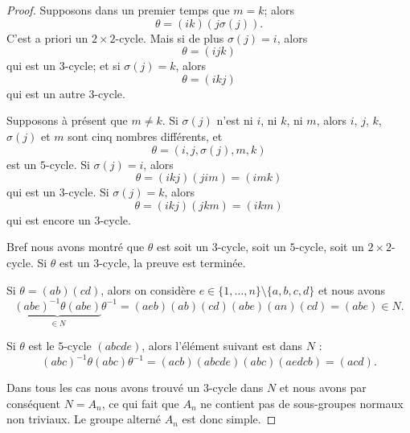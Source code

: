 \begin{proof}
    Supposons dans un premier temps que \( m=k\); alors
    \begin{equation}
        \theta=(ik)(j\sigma(j)).
    \end{equation}
    C'est a priori un \( 2\times 2\)-cycle. Mais si de plus \( \sigma(j) = i \), alors
    \begin{equation}
        \theta=(ijk)
    \end{equation}
    qui est un \( 3\)-cycle; et si \( \sigma(j) = k \), alors
    \begin{equation}
        \theta=(ikj)
    \end{equation}
    qui est un autre \( 3\)-cycle.

    Supposons à présent que \( m \neq k \). Si \( \sigma(j) \) n'est ni $i$, ni $k$, ni $m$, alors \( i\), \( j\), \( k\), \( \sigma(j)\) et \( m\) sont cinq nombres différents, et
    \begin{equation}
        \theta=(i,j,\sigma(j),m,k)
    \end{equation}
    est un \( 5\)-cycle. Si \( \sigma(j) = i\), alors
    \begin{equation}
        \theta=(ikj)(jim) = (imk)
    \end{equation}
    qui est un \( 3\)-cycle. Si \( \sigma(j)=k\), alors
    \begin{equation}
        \theta=(ikj)(jkm) = (ikm)
    \end{equation}
    qui est encore un \( 3\)-cycle.

    Bref nous avons montré que \( \theta\) est soit un \( 3\)-cycle, soit un \( 5\)-cycle, soit un \( 2\times 2\)-cycle. Si \( \theta\) est un \( 3\)-cycle, la preuve est terminée.

    Si \( \theta=(ab)(cd)\), alors on considère \( e\in \{ 1,\ldots, n \}\setminus\{ a,b,c,d \}\) et nous avons
    \begin{equation}
        \underbrace{(abe)^{-1}\theta(abe)}_{\in N}\theta^{-1}=(aeb)(ab)(cd)(abe)(an)(cd)=(abe)\in N.
    \end{equation}

    Si \( \theta\) est le \( 5\)-cycle \( (abcde)\), alors l'élément suivant est dans \( N\) :
    \begin{equation}
        (abc)^{-1}\theta(abc)\theta^{-1}=(acb)(abcde)(abc)(aedcb)=(acd).
    \end{equation}

    Dans tous les cas nous avons trouvé un \( 3\)-cycle dans \( N\) et nous avons par conséquent \( N=A_n\), ce qui fait que \( A_n\) ne contient pas de sous-groupes normaux non triviaux. Le groupe alterné \( A_n\) est donc simple.
\end{proof}


